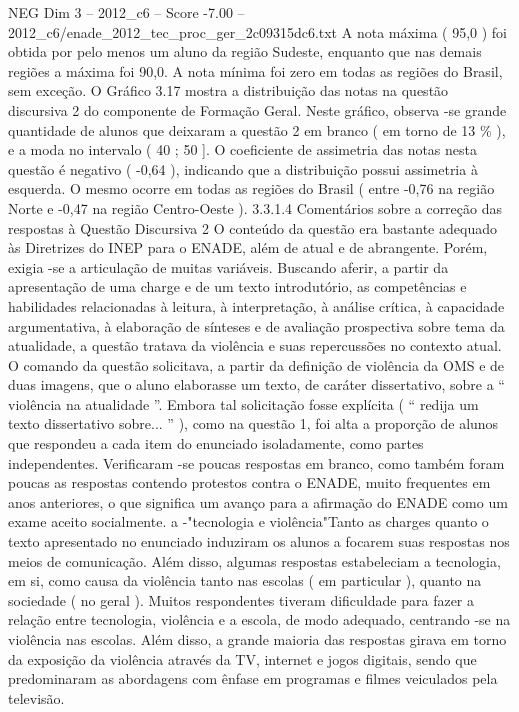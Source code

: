 \begin{textsample}{NEG Dim 3 – 2012\_c6 – Score -7.00 – 2012\_c6/enade\_2012\_tec\_proc\_ger\_2c09315dc6.txt}
A nota máxima ( 95,0 ) foi obtida por pelo menos um aluno da região Sudeste, enquanto que nas demais regiões a máxima foi 90,0.
A nota mínima foi zero em todas as regiões do Brasil, sem exceção.
O Gráfico 3.17 mostra a distribuição das notas na questão discursiva 2 do componente de Formação Geral.
Neste gráfico, observa -se grande quantidade de alunos que deixaram a questão 2 em branco ( em torno de 13 \% ), e a moda no intervalo ( 40 ; 50 ].
O coeficiente de assimetria das notas nesta questão é negativo ( -0,64 ), indicando que a distribuição possui assimetria à esquerda.
O mesmo ocorre em todas as regiões do Brasil ( entre -0,76 na região Norte e -0,47 na região Centro-Oeste ). 3.3.1.4 Comentários sobre a correção das respostas à Questão Discursiva 2 O conteúdo da questão era bastante adequado às Diretrizes do INEP para o ENADE, além de atual e de abrangente.
Porém, exigia -se a articulação de muitas variáveis.
Buscando aferir, a partir da apresentação de uma charge e de um texto introdutório, as competências e habilidades relacionadas à leitura, à interpretação, à análise crítica, à capacidade argumentativa, à elaboração de sínteses e de avaliação prospectiva sobre tema da atualidade, a questão tratava da violência e suas repercussões no contexto atual.
O comando da questão solicitava, a partir da definição de violência da OMS e de duas imagens, que o aluno elaborasse um texto, de caráter dissertativo, sobre a “ violência na atualidade ”.
Embora tal solicitação fosse explícita ( “ redija um texto dissertativo sobre... ” ), como na questão 1, foi alta a proporção de alunos que respondeu a cada item do enunciado isoladamente, como partes independentes.
Verificaram -se poucas respostas em branco, como também foram poucas as respostas contendo protestos contra o ENADE, muito frequentes em anos anteriores, o que significa um avanço para a afirmação do ENADE como um exame aceito socialmente. a -"tecnologia e violência"Tanto as charges quanto o texto apresentado no enunciado induziram os alunos a focarem suas respostas nos meios de comunicação.
Além disso, algumas respostas estabeleciam a tecnologia, em si, como causa da violência tanto nas escolas ( em particular ), quanto na sociedade ( no geral ).
Muitos respondentes tiveram dificuldade para fazer a relação entre tecnologia, violência e a escola, de modo adequado, centrando -se na violência nas escolas.
Além disso, a grande maioria das respostas girava em torno da exposição da violência através da TV, internet e jogos digitais, sendo que predominaram as abordagens com ênfase em programas e filmes veiculados pela televisão.

\end{textsample}
